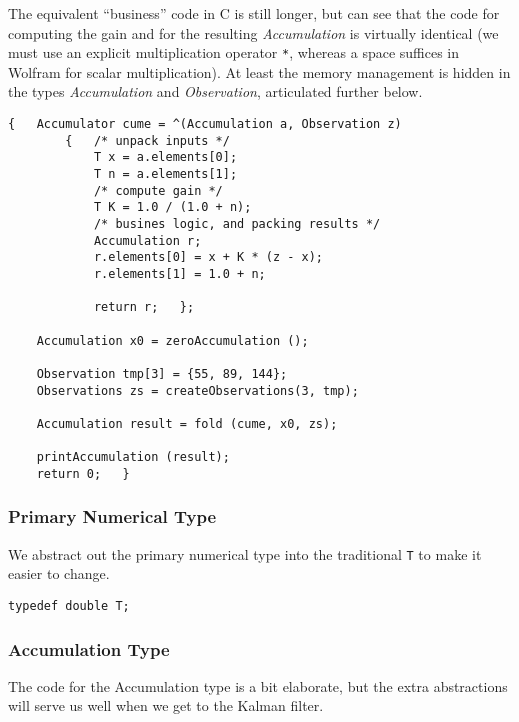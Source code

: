 \documentclass[10pt,oneside,x11names]{article}
\begin{document}
The equivalent ``business'' code in C is still longer, but can see that the code
for computing the gain and for the resulting \emph{Accumulation} is virtually
identical (we must use an explicit multiplication operator \texttt{*}, whereas a space
suffices in Wolfram for scalar multiplication). At least the memory management
is hidden in the types \emph{Accumulation} and \emph{Observation}, articulated further
below.

\begin{verbatim}
{   Accumulator cume = ^(Accumulation a, Observation z)
        {   /* unpack inputs */
            T x = a.elements[0];
            T n = a.elements[1];
            /* compute gain */
            T K = 1.0 / (1.0 + n);
            /* busines logic, and packing results */
            Accumulation r;
            r.elements[0] = x + K * (z - x);
            r.elements[1] = 1.0 + n;

            return r;   };

    Accumulation x0 = zeroAccumulation ();

    Observation tmp[3] = {55, 89, 144};
    Observations zs = createObservations(3, tmp);

    Accumulation result = fold (cume, x0, zs);

    printAccumulation (result);
    return 0;   }
\end{verbatim}

\subsubsection{Primary Numerical Type}
\label{sec:orgheadline5}

We abstract out the primary numerical type into the traditional \texttt{T} to make it
easier to change. 

\begin{verbatim}
typedef double T;
\end{verbatim}

\subsubsection{Accumulation Type}
\label{sec:orgheadline6}

The code for the Accumulation type is a bit elaborate, but the extra
abstractions will serve us well when we get to the Kalman filter.
\end{document}
